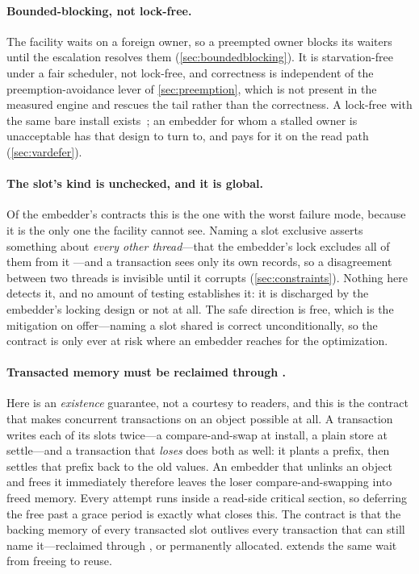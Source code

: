 \documentclass[11pt]{article}
\begin{document}
\paragraph{Bounded-blocking, not lock-free.} The facility waits on a foreign owner,
so a preempted owner blocks its waiters until the escalation resolves them
(\cref{sec:boundedblocking}). It is starvation-free under a fair scheduler, not
lock-free, and correctness is independent of the preemption-avoidance lever of
\cref{sec:preemption}, which is not present in the measured engine and rescues
the tail rather than the correctness. A lock-free \kcas with the same bare
install exists~\citep{guerraoui2020mcas}; an embedder for whom a stalled owner
is unacceptable has that design to turn to, and pays for it on the read path
(\cref{sec:vardefer}).

\paragraph{The slot's kind is unchecked, and it is global.} Of the embedder's
contracts this is the one with the worst failure mode, because it is the only one
the facility cannot see. Naming a slot exclusive asserts something about
\emph{every other thread}---that the embedder's lock excludes all of them from it
---and a transaction sees only its own records, so a disagreement between two
threads is invisible until it corrupts (\cref{sec:constraints}). Nothing here
detects it, and no amount of testing establishes it: it is discharged by the
embedder's locking design or not at all. The safe direction is free, which is the
mitigation on offer---naming a slot shared is correct unconditionally, so the
contract is only ever at risk where an embedder reaches for the optimization.

\paragraph{Transacted memory must be reclaimed through \rcu.} Here \rcu is an
\emph{existence} guarantee, not a courtesy to readers, and this is the contract
that makes concurrent transactions on an object possible at all. A transaction
writes each of its slots twice---a compare-and-swap at install, a plain store at
settle---and a transaction that \emph{loses} does both as well: it plants a
prefix, then settles that prefix back to the old values. An embedder that
unlinks an object and frees it immediately therefore leaves the loser
compare-and-swapping into freed memory. Every attempt runs inside a read-side
critical section, so deferring the free past a grace period is exactly what
closes this. The contract is that the backing memory of every transacted slot
outlives every transaction that can still name it---reclaimed through
, or permanently allocated.  extends the
same wait from freeing to reuse.
\end{document}
